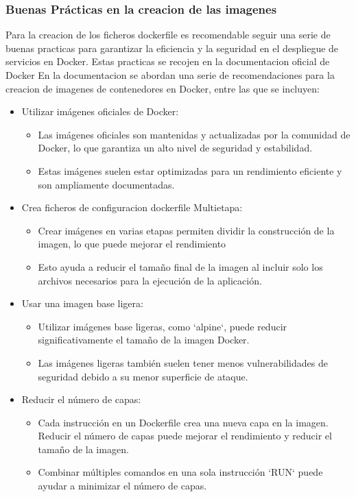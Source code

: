 \documentclass[12pt, a4paper, twoside]{article}
\begin{document}
\subsubsection{Buenas Prácticas en la creacion de las imagenes}
Para la creacion de los ficheros dockerfile es recomendable seguir una serie de buenas practicas para garantizar la eficiencia y la seguridad en el despliegue de servicios en Docker.
Estas practicas se recojen en la documentacion oficial de Docker \cite{dockerfile_best_practices}
En la documentacion se abordan una serie de recomendaciones para la creacion de imagenes de contenedores en Docker, entre las que se incluyen:
\begin{itemize}
    \item Utilizar imágenes oficiales de Docker:
    \begin{itemize}
        \item Las imágenes oficiales son mantenidas y actualizadas por la comunidad de Docker, lo que garantiza un alto nivel de seguridad y estabilidad.
        \item Estas imágenes suelen estar optimizadas para un rendimiento eficiente y son ampliamente documentadas.
    \end{itemize}
    
    \item Crea ficheros de configuracion dockerfile Multietapa:
    \begin{itemize}
        \item Crear imágenes en varias etapas permiten dividir la construcción de la imagen, lo que puede mejorar el rendimiento
        \item Esto ayuda a reducir el tamaño final de la imagen al incluir solo los archivos necesarios para la ejecución de la aplicación.
    \end{itemize}
    
    \item Usar una imagen base ligera:
    \begin{itemize}
        \item Utilizar imágenes base ligeras, como `alpine`, puede reducir significativamente el tamaño de la imagen Docker.
        \item Las imágenes ligeras también suelen tener menos vulnerabilidades de seguridad debido a su menor superficie de ataque.
    \end{itemize}
    
    \item Reducir el número de capas:
    \begin{itemize}
        \item Cada instrucción en un Dockerfile crea una nueva capa en la imagen. Reducir el número de capas puede mejorar el rendimiento y reducir el tamaño de la imagen.
        \item Combinar múltiples comandos en una sola instrucción `RUN` puede ayudar a minimizar el número de capas.
    \end{itemize}
    

\end{itemize}
\end{document}
